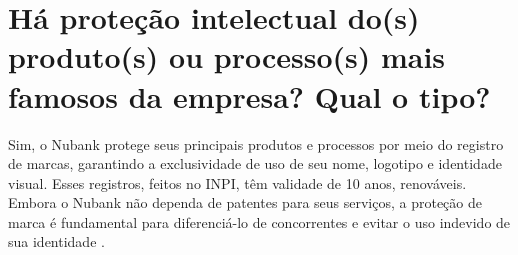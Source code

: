 \section{Há proteção intelectual do(s) produto(s) ou processo(s) mais famosos da empresa? Qual o tipo?}

Sim, o Nubank protege seus principais produtos e processos por meio do registro de marcas, garantindo a exclusividade de uso de seu nome, logotipo e identidade visual. Esses registros, feitos no INPI, têm validade de 10 anos, renováveis. Embora o Nubank não dependa de patentes para seus serviços, a proteção de marca é fundamental para diferenciá-lo de concorrentes e evitar o uso indevido de sua identidade \cite{nubank2024protecao}.
